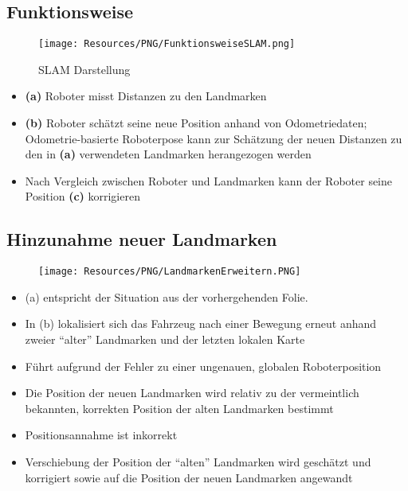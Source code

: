 \subsection{Funktionsweise}
\begin{figure}[H]
	\begin{center}
		\texttt{[image: Resources/PNG/FunktionsweiseSLAM.png]}
		\caption{SLAM Darstellung}
		\label{fig:PNG/FunktionsweiseSLAM.png}
	\end{center}
\end{figure}
\begin{itemize}
	\item \textbf{(a)} Roboter misst Distanzen zu den Landmarken
	\item \textbf{(b)} Roboter schätzt seine neue Position anhand von Odometriedaten; Odometrie-basierte Roboterpose kann zur Schätzung der neuen Distanzen zu den in \textbf{(a)} verwendeten Landmarken herangezogen werden
	\item Nach Vergleich zwischen Roboter und Landmarken kann der Roboter seine Position \textbf{(c)} korrigieren
\end{itemize}
\subsection{Hinzunahme neuer Landmarken}
\begin{figure}[H]
	\begin{center}
		\texttt{[image: Resources/PNG/LandmarkenErweitern.PNG]}
		\caption{}
		\label{fig:PNG/LandmarkenErweitern.PNG}
	\end{center}
\end{figure}
\begin{itemize}
	\item (a) entspricht der Situation aus der vorhergehenden Folie.
	\item In (b) lokalisiert sich das Fahrzeug nach einer Bewegung erneut anhand zweier \enquote{alter} Landmarken und der letzten lokalen Karte
	\item Führt aufgrund der Fehler zu einer ungenauen, globalen Roboterposition
	\item Die Position der neuen Landmarken wird relativ zu der vermeintlich bekannten, korrekten Position der alten Landmarken bestimmt
	\item Positionsannahme ist inkorrekt
	\item Verschiebung der Position der \enquote{alten} Landmarken wird geschätzt und korrigiert sowie auf die Position der neuen Landmarken angewandt
\end{itemize}
